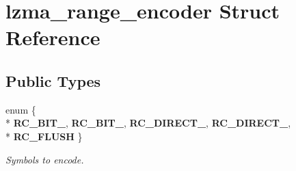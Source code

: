 \section{lzma\-\_\-range\-\_\-encoder Struct Reference}
\label{structlzma__range__encoder}
\subsection*{Public Types}
\begin{DoxyCompactItemize}
\item 
enum \{ \\*
{\bfseries R\-C\-\_\-\-B\-I\-T\-\_}, 
{\bfseries R\-C\-\_\-\-B\-I\-T\-\_}, 
{\bfseries R\-C\-\_\-\-D\-I\-R\-E\-C\-T\-\_}, 
{\bfseries R\-C\-\_\-\-D\-I\-R\-E\-C\-T\-\_}, 
\\*
{\bfseries R\-C\-\_\-\-F\-L\-U\-S\-H}
 \}
\begin{DoxyCompactList}\small\item\em Symbols to encode. \end{DoxyCompactList}\end{DoxyCompactItemize}
